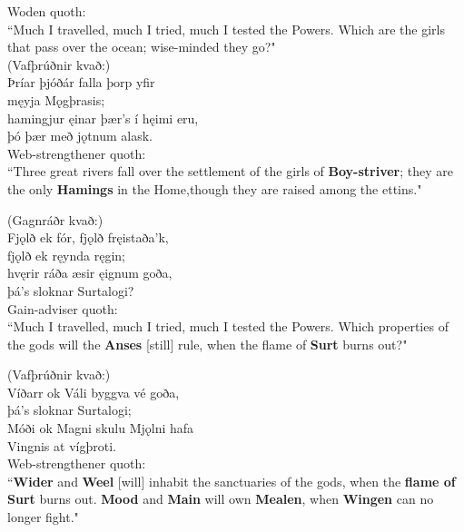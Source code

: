\bvb Woden quoth: \\ “Much I travelled, much I tried, much I tested the Powers. Which are the girls that pass over the ocean; wise-minded they go?" \\

(Vafþrúðnir kvað:) \\%
\bva Þríar þjóðár \hld falla þorp yfir \\%
męyja Mǫgþrasis; \\%
hamingjur ęinar \hld þær's í hęimi eru, \\%
þó þær með jǫtnum alask.\\%

\bvb Web-strengthener quoth: \\ “Three great rivers fall over the settlement of the girls of \textbf{Boy-striver}; they are the only \textbf{Hamings} in the Home,\footnotemark[99] though they are raised among the ettins\footnotemark[100]." \\

(Gagnráðr kvað:) \\%
\bva Fjǫlð ek fór, \hld fjǫlð fręistaða'k, \\%
fjǫlð ek ręynda ręgin; \\%
hvęrir ráða æsir \hld ęignum goða, \\%
þá's sloknar Surtalogi?\\%

\bvb Gain-adviser quoth: \\ “Much I travelled, much I tried, much I tested the Powers. Which properties of the gods will the \textbf{Anses} [still] rule\footnotemark[105], when the flame of \textbf{Surt} burns out?" \\

(Vafþrúðnir kvað:) \\%
\bva Víðarr ok Váli \hld byggva vé goða, \\%
þá's sloknar Surtalogi; \\%
Móði ok Magni \hld skulu Mjǫlni hafa \\%
Vingnis at vígþroti.\\%

\bvb Web-strengthener quoth: \\ “\textbf{Wider} and \textbf{Weel} [will] inhabit the sanctuaries of the gods, when the \textbf{flame of Surt} burns out. \textbf{Mood} and \textbf{Main} will own \textbf{Mealen}, when \textbf{Wingen} can no longer fight\footnotemark[110]." \\

